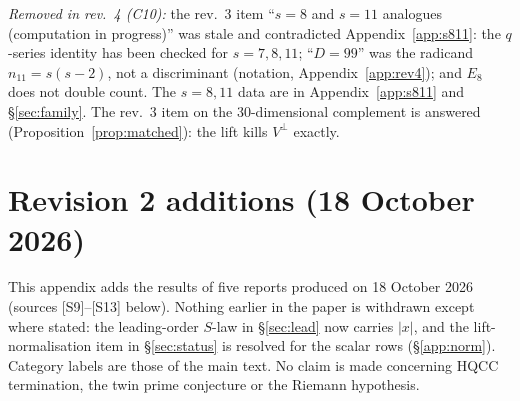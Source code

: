 \documentclass[11pt]{article}
\theoremstyle{definition}
\begin{document}
\emph{Removed in rev.~4 (C10):} the rev.~3 item ``$s=8$ and $s=11$ analogues (computation in progress)'' was stale and contradicted Appendix~\ref{app:s811}: the
$q$-series identity has been checked for $s=7,8,11$; ``$D=99$'' was the radicand $n_{11}=s(s-2)$, not a discriminant (notation, Appendix~\ref{app:rev4}); and $E_8$
does not double count. The $s=8,11$ data are in Appendix~\ref{app:s811} and \S\ref{sec:family}. The rev.~3 item on the $30$-dimensional complement is answered
(Proposition~\ref{prop:matched}): the lift kills $V^\perp$ exactly.

\appendix
\section{Revision 2 additions (18 October 2026)}\label{app:rev2}
This appendix adds the results of five reports produced on 18 October 2026 (sources [S9]--[S13] below). Nothing earlier in the paper is
withdrawn except where stated: the leading-order $S$-law in \S\ref{sec:lead} now carries $|x|$, and the lift-normalisation item in
\S\ref{sec:status} is resolved for the scalar rows (\S\ref{app:norm}). Category labels are those of the main text. No claim is made concerning
HQCC termination, the twin prime conjecture or the Riemann hypothesis.
\end{document}
